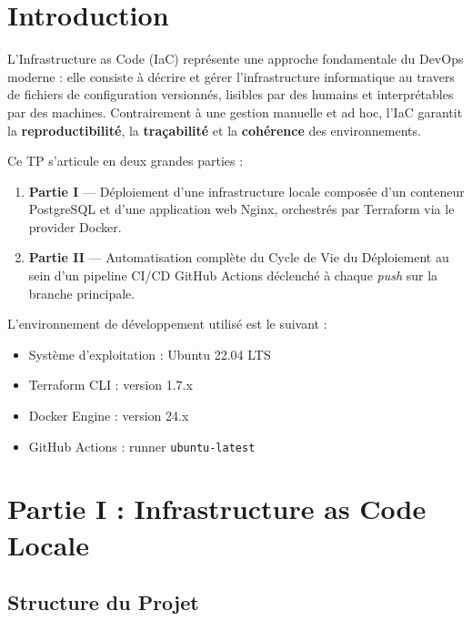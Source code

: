 \documentclass[12pt,a4paper]{report}
\begin{document}
\chapter*{Introduction}

L'Infrastructure as Code (IaC) représente une approche fondamentale du DevOps moderne :
elle consiste à décrire et gérer l'infrastructure informatique au travers de fichiers de
configuration versionnés, lisibles par des humains et interprétables par des machines.
Contrairement à une gestion manuelle et ad hoc, l'IaC garantit la \textbf{reproductibilité},
la \textbf{traçabilité} et la \textbf{cohérence} des environnements.

Ce TP s'articule en deux grandes parties :

\begin{enumerate}
  \item \textbf{Partie I} --- Déploiement d'une infrastructure locale composée d'un conteneur
        PostgreSQL et d'une application web Nginx, orchestrés par Terraform via le provider
        Docker.
  \item \textbf{Partie II} --- Automatisation complète du Cycle de Vie du Déploiement au sein
        d'un pipeline CI/CD GitHub Actions déclenché à chaque \textit{push} sur la branche
        principale.
\end{enumerate}

\noindent L'environnement de développement utilisé est le suivant :
\begin{itemize}
  \item Système d'exploitation : Ubuntu 22.04 LTS
  \item Terraform CLI : version 1.7.x
  \item Docker Engine : version 24.x
  \item GitHub Actions : runner \texttt{ubuntu-latest}
\end{itemize}

\chapter{Partie I : Infrastructure as Code Locale}

\section{Structure du Projet}
\end{document}
